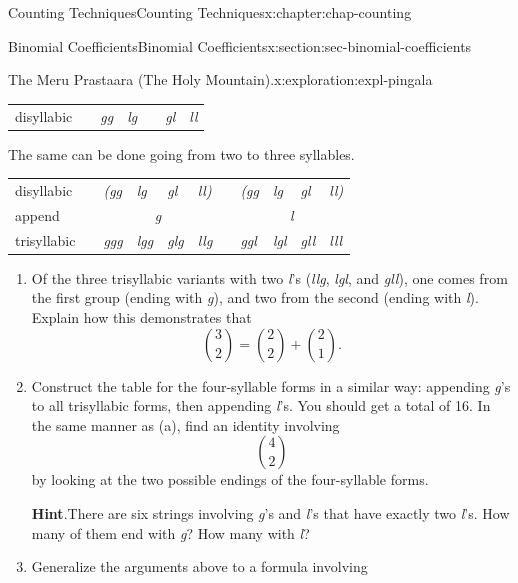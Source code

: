 \documentclass[oneside,10pt,]{book}
\newcommand{\blocktitlefont}{\relax}
\newcommand{\tabularfont}{\relax}
\numberwithin{equation}{section}
\newcommand{\hrulemedium}{\noalign{\hrule height 0.07em}}
\begin{document}
\begin{chapterptx}{Counting Techniques}{}{Counting Techniques}{}{}{x:chapter:chap-counting}
\begin{sectionptx}{Binomial Coefficients}{}{Binomial Coefficients}{}{}{x:section:sec-binomial-coefficients}
\begin{exploration}{The Meru Prastaara (The Holy Mountain).}{x:exploration:expl-pingala}
\begin{sidebyside}{1}{0.15}{0.15}{0}
\begin{sbspanel}{0.7}
{{\begin{tabular}{lllllll}
disyllabic&&\emph{gg}&\emph{lg}&&\emph{gl}&\emph{ll}
\end{tabular}
}%
\par}
\end{sbspanel}%
\end{sidebyside}%
\par
The same can be done going from two to three syllables.%
\begin{sidebyside}{1}{0.15}{0.15}{0}%
\begin{sbspanel}{0.7}%
{\centering%
{\tabularfont%
\begin{tabular}{lllllllllll}
disyllabic&&\emph{(gg}&\emph{lg}&\emph{gl}&\emph{ll)}&&\emph{(gg}&\emph{lg}&\emph{gl}&\emph{ll)}\tabularnewline[0pt]
append&&\multicolumn{4}{c}{\emph{g}}&&\multicolumn{4}{c}{\emph{l}}\tabularnewline\hrulemedium
trisyllabic&&\emph{ggg}&\emph{lgg}&\emph{glg}&\emph{llg}&&\emph{ggl}&\emph{lgl}&\emph{gll}&\emph{lll}
\end{tabular}
}%
\par}
\end{sbspanel}%
\end{sidebyside}%
\begin{enumerate}[font=\bfseries,label=(\alph*),ref=\alph*]
\item{}Of the three trisyllabic variants with two \emph{l}'s (\emph{llg}, \emph{lgl}, and \emph{gll}), one comes from the first group (ending with \emph{g}), and two from the second (ending with \emph{l}). Explain how this demonstrates that%
\begin{equation*}
\binom{3}{2} = \binom{2}{2} + \binom{2}{1}\text{.}
\end{equation*}
%
\item{}Construct the table for the four-syllable forms in a similar way: appending \emph{g}'s to all trisyllabic forms, then appending \emph{l}'s. You should get a total of 16. In the same manner as (a), find an identity involving%
\begin{equation*}
\displaystyle\binom{4}{2}
\end{equation*}
by looking at the two possible endings of the four-syllable forms.%
\par\smallskip%
\noindent\textbf{\blocktitlefont Hint}.\hypertarget{g:hint:id469848}{}\quad{}There are six strings involving \emph{g}'s and \emph{l}'s that have exactly two \emph{l}'s. How many of them end with \emph{g}? How many with \emph{l}?%
\item{}Generalize the arguments above to a formula involving%
\begin{equation*}

\end{equation*}
\end{enumerate}
\end{exploration}
\end{sectionptx}
\end{chapterptx}
\end{document}
